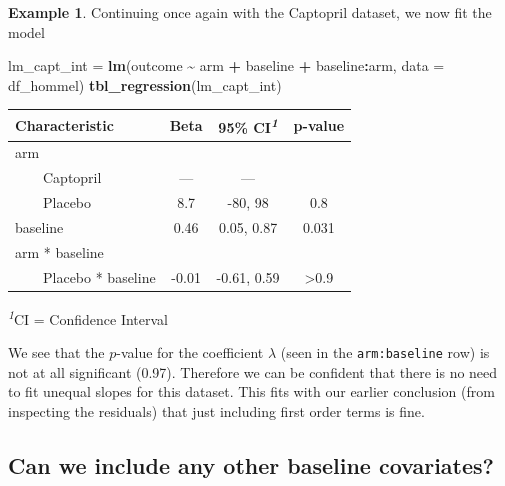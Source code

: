 \documentclass[
  openany]{book}
\newenvironment{Shaded}{\begin{snugshade}}{\end{snugshade}}
\newcommand{\AttributeTok}[1]{\textcolor[rgb]{0.13,0.29,0.53}{#1}}
\newcommand{\FunctionTok}[1]{\textcolor[rgb]{0.13,0.29,0.53}{\textbf{#1}}}
\newcommand{\NormalTok}[1]{#1}
\newcommand{\OtherTok}[1]{\textcolor[rgb]{0.56,0.35,0.01}{#1}}
\newcommand{\SpecialCharTok}[1]{\textcolor[rgb]{0.81,0.36,0.00}{\textbf{#1}}}
\theoremstyle{definition}
\theoremstyle{definition}
\newtheorem{example}{Example}[chapter]
\theoremstyle{definition}
\theoremstyle{definition}
\theoremstyle{remark}
\begin{document}
\begin{example}
Continuing once again with the Captopril dataset, we now fit the model

\begin{Shaded}
\begin{Highlighting}[]
\NormalTok{lm\_capt\_int }\OtherTok{=} \FunctionTok{lm}\NormalTok{(outcome }\SpecialCharTok{\textasciitilde{}}\NormalTok{ arm }\SpecialCharTok{+}\NormalTok{ baseline }\SpecialCharTok{+}\NormalTok{ baseline}\SpecialCharTok{:}\NormalTok{arm, }\AttributeTok{data =}\NormalTok{ df\_hommel)}
\FunctionTok{tbl\_regression}\NormalTok{(lm\_capt\_int)}
\end{Highlighting}
\end{Shaded}

\begin{table}[!t]
\fontsize{12.0pt}{14.4pt}\selectfont
\begin{tabular*}{\linewidth}{@{\extracolsep{\fill}}lccc}
\toprule
\textbf{Characteristic} & \textbf{Beta} & \textbf{95\% CI}\textsuperscript{\textit{1}} & \textbf{p-value} \\ 
\midrule\addlinespace[2.5pt]
arm &  &  &  \\ 
    Captopril & — & — &  \\ 
    Placebo & 8.7 & -80, 98 & 0.8 \\ 
baseline & 0.46 & 0.05, 0.87 & 0.031 \\ 
arm * baseline &  &  &  \\ 
    Placebo * baseline & -0.01 & -0.61, 0.59 & >0.9 \\ 
\bottomrule
\end{tabular*}
\begin{minipage}{\linewidth}
\textsuperscript{\textit{1}}CI = Confidence Interval\\
\end{minipage}
\end{table}

We see that the \(p\)-value for the coefficient \(\lambda\) (seen in the \texttt{arm:baseline} row) is not at all significant (0.97). Therefore we can be confident that there is no need to fit unequal slopes for this dataset. This fits with our earlier conclusion (from inspecting the residuals) that just including first order terms is fine.
\end{example}

\subsection{Can we include any other baseline covariates?}\label{can-we-include-any-other-baseline-covariates}
\end{document}
